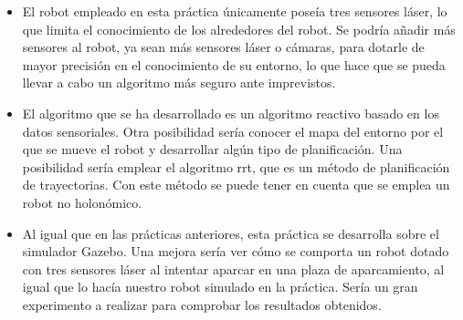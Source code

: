 \begin{itemize}
\item El robot empleado en esta práctica únicamente poseía tres sensores láser, lo que limita el conocimiento de los alrededores del robot. Se podría añadir más sensores al robot, ya sean más sensores láser o cámaras, para dotarle de mayor precisión en el conocimiento de su entorno, lo que hace que se pueda llevar a cabo un algoritmo más seguro ante imprevistos.
\item El algoritmo que se ha desarrollado es un algoritmo reactivo basado en los datos sensoriales. Otra posibilidad sería conocer el mapa del entorno por el que se mueve el robot y desarrollar algún tipo de planificación. Una posibilidad sería emplear el algoritmo \acrfull{rrt}, que es un método de planificación de trayectorias. Con este método se puede tener en cuenta que se emplea un robot no holonómico.
\item Al igual que en las prácticas anteriores, esta práctica se desarrolla sobre el simulador Gazebo. Una mejora sería ver cómo se comporta un robot dotado con tres sensores láser al intentar aparcar en una plaza de aparcamiento, al igual que lo hacía nuestro robot simulado en la práctica. Sería un gran experimento a realizar para comprobar los resultados obtenidos.
\end{itemize}

